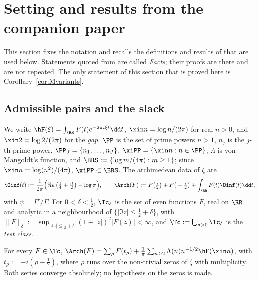 \section{Setting and results from the companion paper}\label{sec:setting}

This section fixes the notation and recalls the definitions and results of \cite{PaperI} that are used below.
Statements quoted from \cite{PaperI} are called \emph{Facts}; their proofs are there and are not repeated. The only
statement of this section that is proved here is Corollary~\ref{cor:Mvariants}.

\subsection{Admissible pairs and the slack}\label{ssec:setting-pairs}

We write $\hF(\xi)=\int_\RR F(t)e^{-2\pi i\xi t}\dd t$, $\xin n=\log n/(2\pi)$ for real $n>0$, and $\xin2=\log2/(2\pi)$
for the \emph{gap}. $\PP$ is the set of prime powers $n>1$, $n_j$ is the $j$-th prime power, $\PP_J=\{n_1,\dots,n_J\}$,
$\xiPP=\{\xin n:n\in\PP\}$, $\Lambda$ is von Mangoldt's function, and $\BRS:=\{\log m/(4\pi):m\ge1\}$; since
$\xin n=\log(n^2)/(4\pi)$, $\xiPP\subset\BRS$. The archimedean data of $\zeta$ are
\[
\Oinf(t):=\frac1{2\pi}\Big(\Re\psi\big(\tfrac14+\tfrac{it}2\big)-\log\pi\Big),\qquad
\Arch(F):=F\big(\tfrac i2\big)+F\big(-\tfrac i2\big)+\int_\RR F(t)\Oinf(t)\dd t,
\]
with $\psi=\Gamma'/\Gamma$. For $0<\delta<\frac12$, $\Tc_\delta$ is the set of even functions $F$, real on $\RR$ and analytic in a
neighbourhood of $\{\lvert\Im z\rvert\le\frac12+\delta\}$, with $\lVert F\rVert_\delta:=\sup_{\lvert\Im z\rvert\le\frac12+\delta}(1+\lvert z\rvert)^2\lvert F(z)\rvert<\infty$,
and $\Tc:=\bigcup_{\delta>0}\Tc_\delta$ is the \emph{test class}.

\begin{fact}\label{lem:explicit-formula}
For every $F\in\Tc$,
$\Arch(F)=\sum_\rho F(t_\rho)+\frac1\pi\sum_{n\ge2}\Lambda(n)n^{-1/2}\hF(\xin n)$, with $t_\rho:=-i(\rho-\frac12)$, where $\rho$
runs over the non-trivial zeros of $\zeta$ with multiplicity. Both series converge absolutely; no hypothesis on the zeros
is made.
\end{fact}

